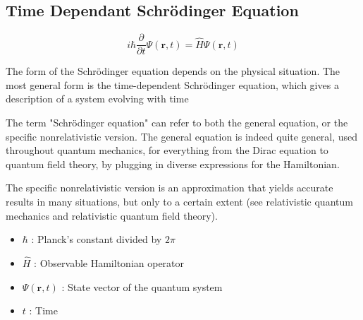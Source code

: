 \subsection{Time Dependant Schrödinger Equation}


$$ i \hbar \frac{\partial}{\partial t}\Psi(\mathbf{r},t) = \hat H \Psi(\mathbf{r},t) $$


The form of the Schrödinger equation depends on the physical situation. The most general form is the time-dependent Schrödinger equation, which gives a description of a system evolving with time

The term "Schrödinger equation" can refer to both the general equation, or the specific nonrelativistic version. The general equation is indeed quite general, used throughout quantum mechanics, for everything from the Dirac equation to quantum field theory, by plugging in diverse expressions for the Hamiltonian. 

The specific nonrelativistic version is an approximation that yields accurate results in many situations, but only to a certain extent (see relativistic quantum mechanics and relativistic quantum field theory).

\begin{itemize}
    \item $ \hbar $ : Planck's constant divided by $ 2\pi $
    \item $ \hat H $ : Observable Hamiltonian operator
    \item $ \Psi(\mathbf{r},t) $ : State vector of the quantum system
    \item $ t $ : Time
\end{itemize}
